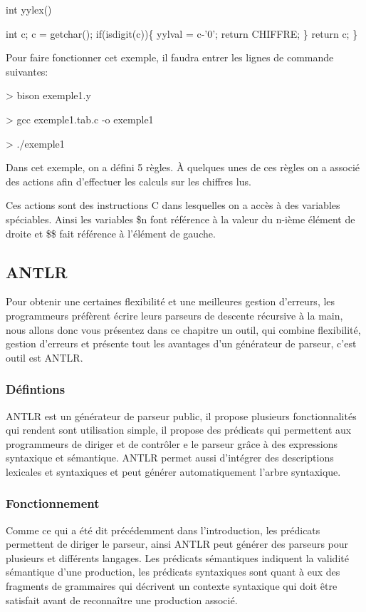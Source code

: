 \documentclass{article}
\begin{document}
int yylex()\\{
    int c;
    c = getchar();
    if(isdigit(c))\{
        yylval = c-'0';
        return CHIFFRE;
    \}
    return c;
\}

Pour faire fonctionner cet exemple, il faudra entrer les lignes de commande suivantes:

> bison exemple1.y

> gcc exemple1.tab.c -o exemple1

> ./exemple1

Dans cet exemple, on a défini 5 règles. À quelques unes de ces règles on a associé des actions afin d’effectuer les calculs sur les chiffres lus.

Ces actions sont des instructions C dans lesquelles on a accès à des variables spéciables.
Ainsi les variables \$n font référence à la valeur du n-ième élément de droite et \$\$ fait référence à l’élément de gauche.

\subsection{ANTLR}
Pour obtenir une certaines flexibilité et une meilleures gestion d’erreurs, les programmeurs préfèrent écrire leurs parseurs de descente récursive à la main, nous allons donc vous présentez dans ce chapitre un outil, qui combine flexibilité, gestion d’erreurs  et présente tout les avantages d’un générateur de parseur, c’est outil est ANTLR.
\subsubsection{Défintions}
ANTLR est un générateur de parseur public, il propose plusieurs fonctionnalités qui rendent sont utilisation simple, il propose  des prédicats qui permettent aux programmeurs de diriger et de contrôler e le parseur grâce à des expressions syntaxique et sémantique.
ANTLR permet aussi d’intégrer des  descriptions lexicales et syntaxiques  et peut générer automatiquement l’arbre syntaxique.
\subsubsection{Fonctionnement}
Comme ce qui a été dit précédemment dans l’introduction, les prédicats permettent de diriger le parseur, ainsi ANTLR peut générer des parseurs pour plusieurs et différents langages.
Les prédicats sémantiques indiquent la validité sémantique d’une production, les prédicats syntaxiques sont quant à eux des fragments de grammaires qui décrivent un contexte syntaxique qui doit être satisfait avant de reconnaître une production associé.
}
\end{document}
